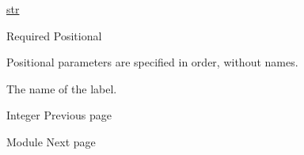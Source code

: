 \href{/docs/reference/foundations/str/}{str}

{Required} {{ Positional }}

\label{constructor-name-positional-tooltip}
Positional parameters are specified in order, without names.

The name of the label.

\href{/docs/reference/foundations/int/}{\pandocbounded{}}

{ Integer } { Previous page }

\href{/docs/reference/foundations/module/}{\pandocbounded{}}

{ Module } { Next page }
